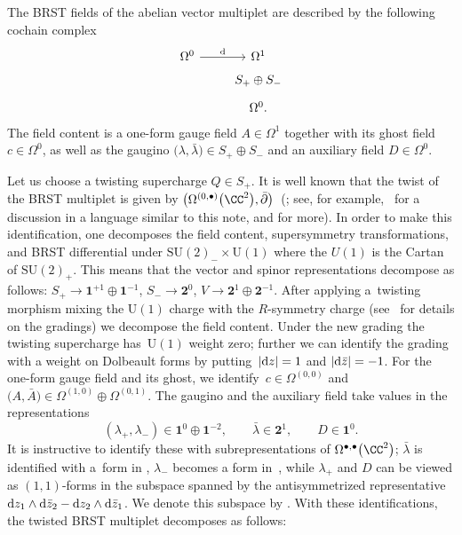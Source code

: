 \documentclass[10pt,a4paper]{amsart}
\numberwithin{equation}{section}
\theoremstyle{definition}
\def\d{{\rm d}}
\def\bu{\bullet}
\def\U{\ensuremath{\mathrm{U}}}
\begin{document}
The BRST fields of the abelian vector multiplet are described by the following cochain complex
\[%
 \begin{tikzcd}[row sep=tiny]
 \Omega^0 \arrow[r,"\d"] & \Omega^1 \\
 & S_+ \oplus S_- \\
 & \Omega^0.
 \end{tikzcd}
\]
The field content is a one-form gauge field $A \in \Omega^1$ together with its ghost field $c \in \Omega^0$, as well as the gaugino $\big(\lambda, \bar{\lambda}\big) \in S_+ \oplus S_-$ and an auxiliary field $D \in \Omega^0$.

Let us choose a twisting supercharge $Q \in S_+$. It is well known that the twist of the BRST multiplet is given by $\big(\Omega^{(0,\bu)}\big(\CC^2\big) , \bar{\partial}\big)$~(\cite{JohansenHet, nikitathesis}; see, for example,~\cite{SWchar} for a discussion in a language similar to this note, and \cite{Budzik:2023xbr,Budzik:2022mpd} for more). In order to make this identification, one decomposes the field content, supersymmetry transformations, and BRST differential under $\mathrm{SU}(2)_- \times \U(1)$ where the $U(1)$ is the Cartan of $\mathrm{SU}(2)_+$. This means that the vector and spinor representations decompose as follows:
$ S_+ \rightarrow \textbf{1}^{+1} \oplus \textbf{1}^{-1}$, $ S_- \rightarrow \textbf{2}^0$, $V \rightarrow \textbf{2}^1 \oplus \textbf{2}^{-1}$.
After applying a~twisting morphism mixing the $\U(1)$ charge with the $R$-symmetry charge (see~\cite{SWchar} for details on the gradings) we decompose the field content. Under the new grading the twisting supercharge has~$\U(1)$ weight zero; further we can identify the grading with a weight on Dolbeault forms by putting~${|\d z| =1}$ and $|\d \bar{z}|=-1$. For the one-form gauge field and its ghost, we identify~${
 c \in \Omega^{(0,0)}} $ and $ \big(A, \bar{A}\big) \in \Omega^{(1,0)} \oplus \Omega^{(0,1)}$.
The gaugino and the auxiliary field take values in the representations
\[
 (\lambda_+ , \lambda_-) \in \textbf{1}^{0} \oplus \textbf{1}^{-2}, \qquad \bar{\lambda} \in \textbf{2}^1, \qquad D \in \textbf{1}^0.
 \]
It is instructive to identify these with subrepresentations of $\Omega^{\bu,\bu}\big(\CC^2\big)$; $\bar{\lambda}$ is identified with a~form in , $\lambda_-$ becomes a form in~, while $\lambda_+$ and $D$ can be viewed as $(1,1)$-forms in the subspace spanned by the antisymmetrized representative~${\d z_1 \wedge \d \bar{z}_2 - \d z_2 \wedge \d \bar{z}_1}$. We denote this subspace by . With these identifications, the twisted BRST multiplet decomposes as follows:
\end{document}
